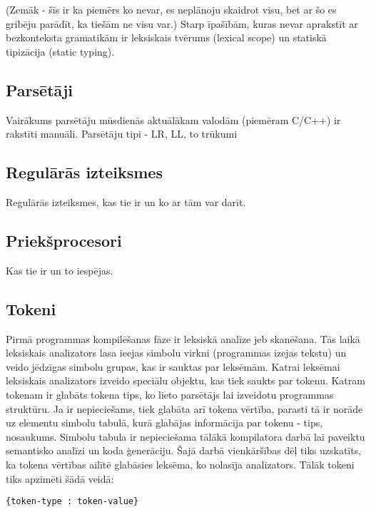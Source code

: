 
(Zemāk - šīs ir ka piemērs ko nevar, es neplānoju skaidrot visu, bet ar šo es gribēju parādīt, ka tiešām ne visu var.)
Starp īpašībām, kuras nevar aprakstīt ar bezkonteksta gramatikām ir leksiskais tvērums (lexical scope) un statiskā tipizācija (static typing).

\subsection{Parsētāji}

Vairākums parsētāju mūsdienās aktuālākam valodām (piemēram C/C++) ir rakstīti manuāli. 
Parsētāju tipi - LR, LL, to trūkumi

\subsection{Regulārās izteiksmes}
Regulārās izteiksmes, kas tie ir un ko ar tām var darīt.

\subsection{Priekšprocesori}
Kas tie ir un to iespējas.

\subsection{Tokeni}
Pirmā programmas kompilēšanas fāze ir leksiskā analīze jeb skanēšana. Tās laikā leksiskais analizators lasa ieejas simbolu virkni (programmas izejas tekstu) un veido jēdzīgas simbolu grupas, kas ir sauktas par leksēmām. Katrai leksēmai leksiskais analizators izveido speciālu objektu, kas tiek saukts par tokenu. Katram tokenam ir glabāts tokena tips, ko lieto parsētājs lai izveidotu programmas struktūru. Ja ir nepieciešams, tiek glabāta arī tokena vērtība, parasti tā ir norāde uz elementu simbolu tabulā, kurā glabājas informācija par tokenu - tips, nosaukums. Simbolu tabula ir nepieciešama tālākā kompilatora darbā lai paveiktu semantisko analīzi un koda ģenerāciju. Šajā darbā vienkāršības dēļ tiks uzskatīts, ka tokena vērtības ailītē glabāsies   leksēma, ko nolasīja analizators. Tālāk tokeni tiks apzimēti šādā veidā:

\begin{verbatim}
{token-type : token-value}
\end{verbatim}

